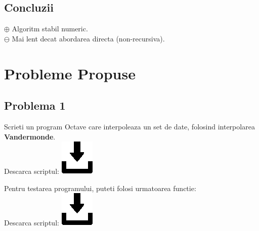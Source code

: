 \documentclass{article}
\begin{document}
\subsection{Concluzii}
\tab
$\oplus$ Algoritm stabil numeric.\\

$\ominus$ Mai lent decat abordarea directa (non-recursiva).\\


\section{Probleme Propuse}
\label{sec:probleme}



\lstset{style=mystyle}

\subsection{Problema 1}
\tab Scrieti un program Octave care interpoleaza un set de date, folosind interpolarea \textbf{Vandermonde}.\\
\tabto{0.5cm} Descarca scriptul:
\href{https://github.com/Iulian277/Interpolation/blob/main/Vandermonde/vandermonde.m}{\includegraphics[scale=0.35]{download_button}}


Pentru testarea programului, puteti folosi urmatoarea functie:\\
\tabto{0.5cm} Descarca scriptul:
\href{https://github.com/Iulian277/Interpolation/blob/main/Vandermonde/test_vandermonde.m}{\includegraphics[scale=0.35]{download_button}}

\end{document}
